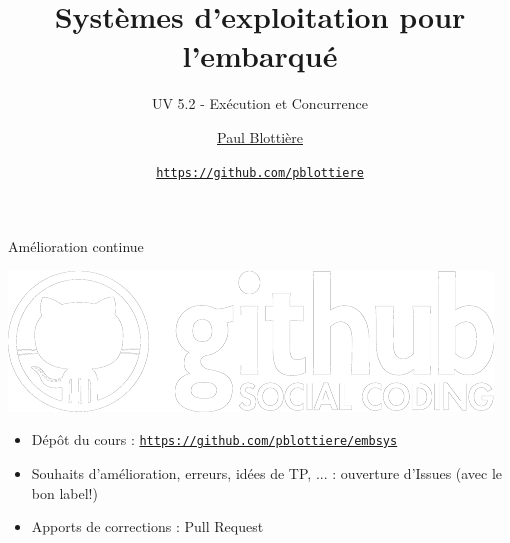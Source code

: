 \documentclass[12pt,t]{beamer}
\title{Systèmes d'exploitation pour l'embarqué}
\subtitle{UV 5.2 - Exécution et Concurrence}
\author{\href{}{Paul Blottière}}
\institute{
    \href{http://www.ensta-bretagne.fr/}{ENSTA Bretagne} \\[2pt]
    \href{}{\tt \scriptsize 10 Novembre 2015}
}
\date{
    \href{https://github.com/pblottiere}{\tt \scriptsize https://github.com/pblottiere} \\[2pt]
}
\newcommand{\bi}{\begin{itemize}}
\newcommand{\ei}{\end{itemize}}
\begin{document}
{
\frame{
    \titlepage
} }

\begin{frame}{Amélioration continue}
    \vspace{12pt}

    \begin{center}
    \includegraphics[scale=0.7]{github.png}
    \end{center}

    \bi
    \itemsep12pt
    \item Dépôt du cours : \href{https://github.com/pblottiere/embsys}{\tt \scriptsize https://github.com/pblottiere/embsys}
    \item Souhaits d'amélioration, erreurs, idées de TP, ... : ouverture d'Issues (avec le bon label!)
    \item Apports de corrections : Pull Request
    \ei
\end{frame}


\end{document}

